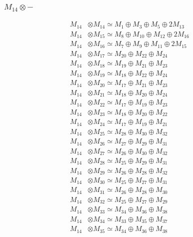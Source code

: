 \subsubsection{$ M_{14}\otimes -$}
\begin{align*}
M_{14} &\otimes M_{14} \simeq M_{1} \oplus M_{3} \oplus M_{5} \oplus 2M_{13} \\
M_{14} &\otimes M_{15} \simeq M_{8} \oplus M_{10} \oplus M_{12} \oplus 2M_{16} \\
M_{14} &\otimes M_{16} \simeq M_{7} \oplus M_{9} \oplus M_{11} \oplus 2M_{15} \\
M_{14} &\otimes M_{17} \simeq M_{20} \oplus M_{22} \oplus M_{24} \\
M_{14} &\otimes M_{18} \simeq M_{19} \oplus M_{21} \oplus M_{23} \\
M_{14} &\otimes M_{19} \simeq M_{18} \oplus M_{22} \oplus M_{24} \\
M_{14} &\otimes M_{20} \simeq M_{17} \oplus M_{21} \oplus M_{23} \\
M_{14} &\otimes M_{21} \simeq M_{18} \oplus M_{20} \oplus M_{24} \\
M_{14} &\otimes M_{22} \simeq M_{17} \oplus M_{19} \oplus M_{23} \\
M_{14} &\otimes M_{23} \simeq M_{18} \oplus M_{20} \oplus M_{22} \\
M_{14} &\otimes M_{24} \simeq M_{17} \oplus M_{19} \oplus M_{21} \\
M_{14} &\otimes M_{25} \simeq M_{28} \oplus M_{30} \oplus M_{32} \\
M_{14} &\otimes M_{26} \simeq M_{27} \oplus M_{29} \oplus M_{31} \\
M_{14} &\otimes M_{27} \simeq M_{26} \oplus M_{30} \oplus M_{32} \\
M_{14} &\otimes M_{28} \simeq M_{25} \oplus M_{29} \oplus M_{31} \\
M_{14} &\otimes M_{29} \simeq M_{26} \oplus M_{28} \oplus M_{32} \\
M_{14} &\otimes M_{30} \simeq M_{25} \oplus M_{27} \oplus M_{31} \\
M_{14} &\otimes M_{31} \simeq M_{26} \oplus M_{28} \oplus M_{30} \\
M_{14} &\otimes M_{32} \simeq M_{25} \oplus M_{27} \oplus M_{29} \\
M_{14} &\otimes M_{33} \simeq M_{34} \oplus M_{36} \oplus M_{38} \\
M_{14} &\otimes M_{34} \simeq M_{33} \oplus M_{35} \oplus M_{37} \\
M_{14} &\otimes M_{35} \simeq M_{34} \oplus M_{36} \oplus M_{38} \\

\end{align*}
